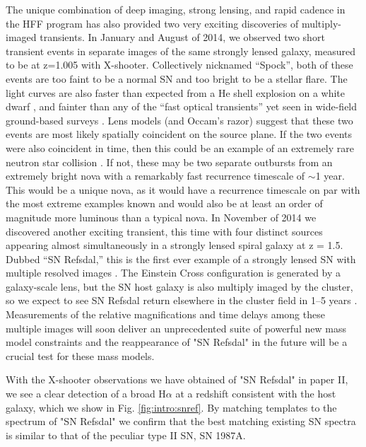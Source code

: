 The unique combination of deep imaging, strong lensing, and rapid cadence in the
HFF program has also provided two very exciting discoveries of multiply-imaged
transients. In January and August of 2014, we observed two short transient
events in separate images of the same strongly lensed galaxy, measured to be at
z=1.005 with X-shooter. Collectively nicknamed “Spock”, both
of these events are
too faint to be a normal SN and too bright to be a stellar
flare. The light
curves are also faster than expected from a He shell explosion
on a white dwarf
\citep[a “.Ia” event][]{Bildsten2007}, and fainter than any of
the “fast optical
transients” yet seen in wide-field ground-based surveys
\citep[e.g.][]{Kasliwal2010, Poznanski2010a, Vinko2014}.
Lens models (and
Occam’s razor) suggest that these two events are most likely
spatially
coincident on the source plane. If the two events were also coincident
in time,
then this could be an example of an extremely rare neutron star
collision
\citep[a “kilonova”][]{Tanvir2013, Barnes2013}. If not, these may be
two
separate outbursts from an extremely bright nova with a remarkably fast
recurrence timescale of $\sim$1 year. This would be a unique nova, as it would
have a recurrence timescale on par with the most extreme examples known
\citep{Tang2014} and would also be at least an order of magnitude more luminous
than a typical nova.
In November of 2014 we discovered another exciting
transient, this time with
four distinct sources appearing almost simultaneously
in a strongly lensed
spiral galaxy at z = 1.5. Dubbed “SN Refsdal,” this is the
first ever example of
a strongly lensed SN with multiple resolved images
\citep[][Figure
3]{Kelly2014}. The Einstein Cross configuration is generated by
a galaxy-scale
lens, but the SN host galaxy is also multiply imaged by the
cluster, so we
expect to see SN Refsdal return elsewhere in the cluster field in
1–5 years
\citep{Oguri2015, Sharon2015}. Measurements of the relative
magnifications and
time delays among these multiple images will soon deliver an
unprecedented suite
of powerful new mass model constraints and the reappearance
of "SN Refsdal" in the future will be a crucial test for these mass models. 

With the X-shooter observations we have obtained of "SN Refsdal" in paper II, we
see a clear
detection of a broad H$\alpha$ at a redshift consistent with the
host galaxy,
which we show in Fig. \ref{fig:intro:snref}. By matching templates
to the
spectrum of "SN Refsdal" we confirm that the best matching existing SN
spectra
is similar to that of the peculiar type II SN, SN 1987A.
 


